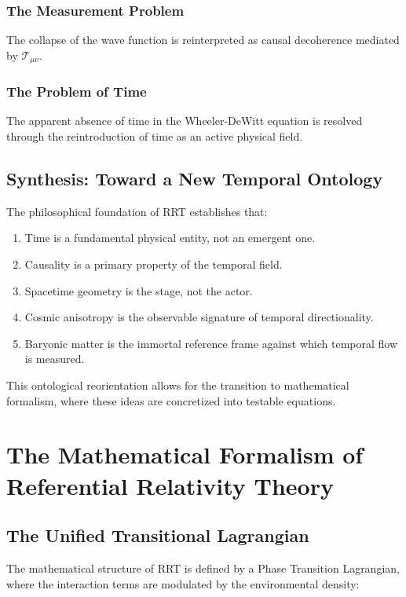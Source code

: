 \documentclass[12pt,a4paper]{article}
\begin{document}
\subsubsection{The Measurement Problem}
The collapse of the wave function is reinterpreted as causal decoherence mediated by $\mathcal{T}_{\mu\nu}$.

\subsubsection{The Problem of Time}
The apparent absence of time in the Wheeler-DeWitt equation is resolved through the reintroduction of time as an active physical field.

\subsection{Synthesis: Toward a New Temporal Ontology}
The philosophical foundation of RRT establishes that:
\begin{enumerate}
    \item Time is a fundamental physical entity, not an emergent one.
    \item Causality is a primary property of the temporal field.
    \item Spacetime geometry is the stage, not the actor.
    \item Cosmic anisotropy is the observable signature of temporal directionality.
    \item Baryonic matter is the immortal reference frame against which temporal flow is measured.
\end{enumerate}

This ontological reorientation allows for the transition to mathematical formalism, where these ideas are concretized into testable equations.

\section{The Mathematical Formalism of Referential Relativity Theory}

\subsection{The Unified Transitional Lagrangian}
The mathematical structure of RRT is defined by a Phase Transition Lagrangian, where the interaction terms are modulated by the environmental density:
\end{document}
